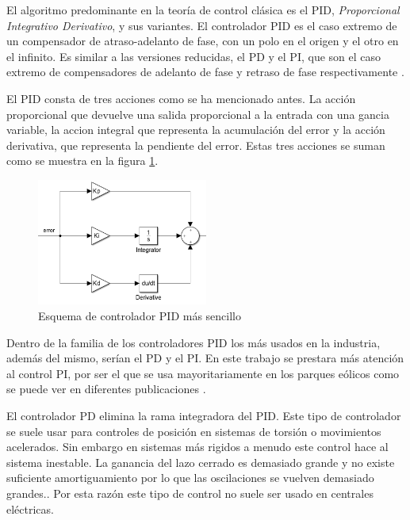 \documentclass{book}
\begin{document}
El algoritmo predominante en la teor\'ia de control cl\'asica es el PID, \emph{Proporcional Integrativo Derivativo}, y sus variantes. El controlador PID es el caso extremo de un compensador de atraso-adelanto de fase, con un polo en el origen y el otro en el infinito. Es similar a las versiones reducidas, el PD y el PI, que son el caso extremo de compensadores de adelanto de fase y retraso de fase respectivamente \cite{PIDanalysis}. \par

El PID consta de tres acciones como se ha mencionado antes. La acci\'on proporcional que devuelve una salida proporcional a la entrada con una gancia variable, la accion integral que representa la acumulaci\'on del error y la acci\'on derivativa, que representa la pendiente del error. Estas tres acciones se suman como se muestra en la figura \ref{EsquemaPID}. \par


\begin{figure}[h!]
\centering
\includegraphics[width=0.5\textwidth]{EsquemaPID.PNG}
\caption{Esquema de controlador PID m\'as sencillo}
\label{EsquemaPID}
\end{figure}\par

Dentro de la familia de los controladores PID los m\'as usados en la industria, adem\'as del mismo, ser\'ian el PD y el PI. En este trabajo se prestara m\'as atenci\'on al control PI, por ser el que se usa mayoritariamente en los parques e\'olicos como se puede ver en diferentes publicaciones \cite{WindFarmController, PI_QV, SPControl, ExamplePI, ExamplePI1}. \par

El controlador PD elimina la rama integradora del PID. Este tipo de controlador se suele usar para controles de posici\'on en sistemas de torsi\'on o movimientos acelerados. Sin embargo en sistemas m\'as rigidos a menudo este control hace al sistema inestable. La ganancia del lazo cerrado es demasiado grande y no existe suficiente amortiguamiento por lo que las oscilaciones se vuelven demasiado grandes.\cite{PDanalysis}. Por esta raz\'on este tipo de control no suele ser usado en centrales el\'ectricas. \par
\end{document}
